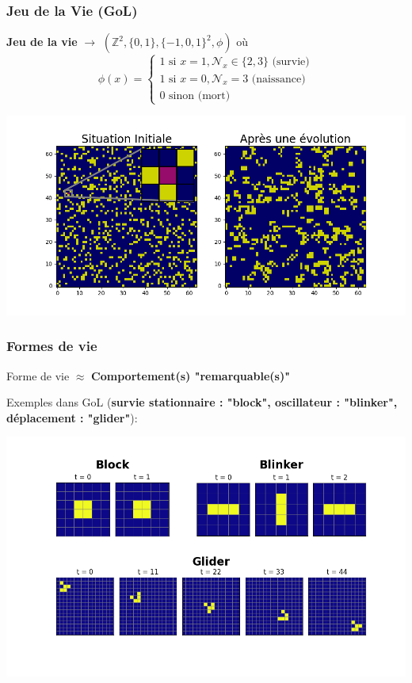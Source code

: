 \documentclass[aspectratio=43]{beamer}
\begin{document}
\begin{frame}
	\frametitle{Jeu de la Vie (GoL)}

	\textbf{Jeu de la vie} $\longrightarrow$ $(\mathbb{Z}^2, \{0, 1\}, \{-1, 0, 1\}^2, \phi)$ o\`u
	\[
		\phi(x) = 
		\begin{cases}	
			1 \text{ si } x = 1, \mathcal{N}_x \in \{2, 3\} \text{ (survie)} \\
			1 \text{ si } x = 0, \mathcal{N}_x = 3 \text{ (naissance)} \\
			0 \text{ sinon (mort)}
		\end{cases}
	\]

	\centering\includegraphics[width=.9\textwidth]{plot_evolution_gol.png}
	
\end{frame}

\begin{frame}
	\frametitle{Formes de vie}
	\centering
	Forme de vie $\approx$ \textbf{Comportement(s) "remarquable(s)"}

	\vspace{20pt}
	Exemples dans GoL (\textbf{survie stationnaire : "block", oscillateur : "blinker", d\'eplacement : "glider"}):

	\centering\includegraphics[width=.9\textwidth]{plot_species_gol.png}

\end{frame}
\end{document}

